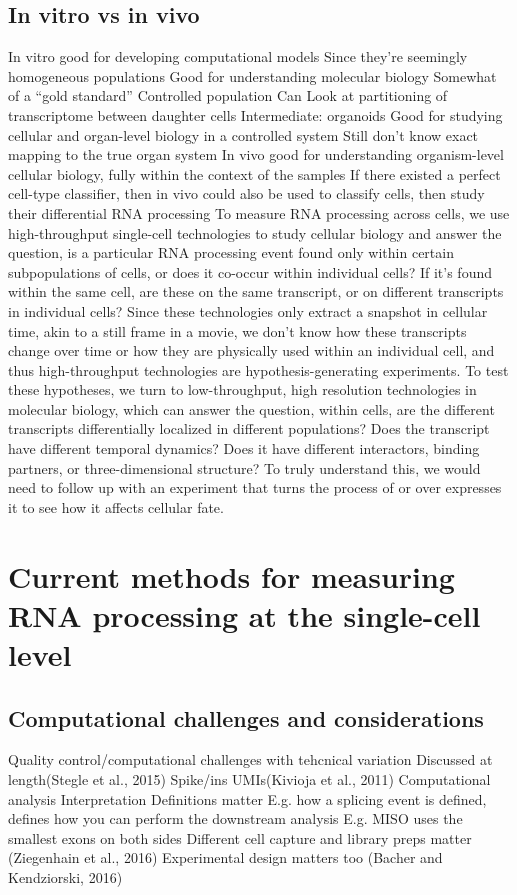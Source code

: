 \subsection{In vitro vs in vivo}
In vitro 
good for developing computational models 
Since they’re seemingly homogeneous populations
Good for understanding molecular biology
Somewhat of a “gold standard”
Controlled population
Can Look at partitioning of transcriptome between daughter cells
Intermediate: organoids
Good for studying cellular and organ-level biology in a controlled system
Still don’t know exact mapping to the true organ system
In vivo  
good for understanding organism-level cellular biology, fully within the context of the samples
If there existed a perfect cell-type classifier, then in vivo could also be used to classify cells, then study their differential RNA processing
To measure RNA processing across cells, we use high-throughput single-cell technologies to study cellular biology and answer the question, is a particular RNA processing event found only within certain subpopulations of cells, or does it co-occur within individual cells? If it’s found within the same cell, are these on the same transcript, or on different transcripts in individual cells? Since these technologies only extract a snapshot in cellular time, akin to a still frame in a movie, we don’t know how these transcripts change over time or how they are physically used within an individual cell, and thus high-throughput technologies are hypothesis-generating experiments. 
To test these hypotheses, we turn to low-throughput, high resolution technologies in molecular biology, which can answer the question, within cells, are the different transcripts differentially localized in different populations? Does the transcript have different temporal dynamics? Does it have different interactors, binding partners, or three-dimensional structure? To truly understand this, we would need to follow up with an experiment that turns the process of or over expresses it to see how it affects cellular fate.


\section{Current methods for measuring RNA processing at the single-cell level}
\subsection{Computational challenges and considerations}
Quality control/computational challenges with tehcnical variation
Discussed at length(Stegle et al., 2015)
Spike/ins UMIs(Kivioja et al., 2011)
Computational analysis
Interpretation
Definitions matter
E.g. how a splicing event is defined, defines how you can perform the downstream analysis
E.g. MISO uses the smallest exons on both sides
Different cell capture and library preps matter (Ziegenhain et al., 2016)
Experimental design matters too (Bacher and Kendziorski, 2016)

